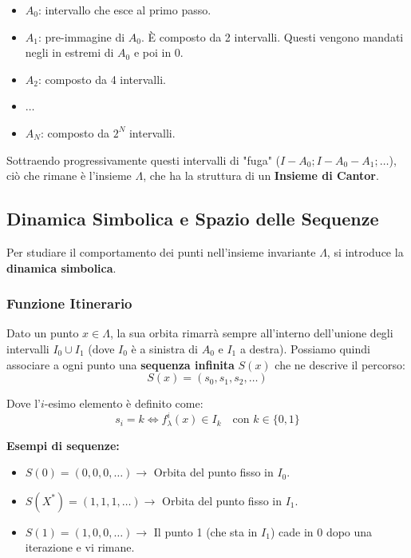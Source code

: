 \documentclass[openany]{book}
\theoremstyle{definition}
\theoremstyle{remark}
\begin{document}
\begin{minipage}{0.5\textwidth}
    \begin{itemize}
        \item $A_0$: intervallo che esce al primo passo.
        \item $A_1$: pre-immagine di $A_0$. È composto da 2 intervalli. Questi vengono mandati negli in \textcolor{green!50!black}{estremi} di $A_0$ e poi in $0$.
        \item $A_2$: composto da 4 intervalli.
        \item $\dots$
        \item $A_N$: composto da $2^N$ intervalli.
    \end{itemize}
\end{minipage}

\vspace{1em}
\begin{tcolorbox}[colback=yellow!5!white,colframe=yellow!60!black]
Sottraendo progressivamente questi intervalli di "fuga" ($I - A_0; I - A_0 - A_1; \dots$), ciò che rimane è l'insieme $\Lambda$, che ha la struttura di un \textbf{Insieme di Cantor}.
\end{tcolorbox}

 \subsection{Dinamica Simbolica e Spazio delle Sequenze}

Per studiare il comportamento dei punti nell'insieme invariante $\Lambda$, si introduce la \textbf{dinamica simbolica}.

\subsubsection*{Funzione Itinerario}
Dato un punto $x \in \Lambda$, la sua orbita rimarrà sempre all'interno dell'unione degli intervalli $I_0 \cup I_1$ (dove $I_0$ è a sinistra di $A_0$ e $I_1$ a destra).
Possiamo quindi associare a ogni punto una \textbf{sequenza infinita} $S(x)$ che ne descrive il percorso:
$$ S(x) = (s_0, s_1, s_2, \dots) $$

Dove l'$i$-esimo elemento è definito come:
$$ s_i = k \iff f_\lambda^i(x) \in I_k \quad \text{con } k \in \{0, 1\} $$

\textbf{Esempi di sequenze:}
\begin{itemize}
    \item $S(0) = (0, 0, 0, \dots) \to$ Orbita del punto fisso in $I_0$.
    \item $S(X^*) = (1, 1, 1, \dots) \to$ Orbita del punto fisso in $I_1$.
    \item $S(1) = (1, 0, 0, \dots) \to$ Il punto 1 (che sta in $I_1$) cade in 0 dopo una iterazione e vi rimane.
\end{itemize}
\end{document}
